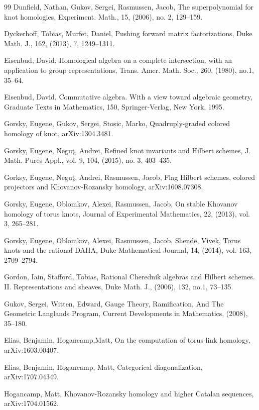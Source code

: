 \documentclass[10pt]{amsart}
\begin{document}
\begin{thebibliography}{99}
Dunfield, Nathan,
Gukov, Sergei,
Rasmussen, Jacob,
The superpolynomial for knot homologies,
Experiment. Math.,
15,
(2006),
no. 2,
129--159.


Dyckerhoff, Tobias, Murfet, Daniel,
Pushing forward matrix factorizations,
Duke Math. J.,
162,
(2013),
7,
1249--1311.


Eisenbud, David,
Homological algebra on a complete intersection, with an application to group representations,
Trans. Amer. Math. Soc.,
260,
(1980),
no.1,
35--64.

Eisenbud, David, Commutative algebra. With a view toward algebraic geometry, Graduate Texts in Mathematics, 150, Springer-Verlag,
New York,
1995.



 Gorsky, Eugene,
Gukov, Sergei,
Stosic, Marko,
Quadruply-graded colored homology of knot, arXiv:1304.3481.

Gorsky, Eugene,
Negu{\c t}, Andrei,
 Refined knot invariants and Hilbert schemes,
J. Math. Pures Appl.,
vol. 9,
104,
(2015),
no. 3,
403--435.

Gorksy, Eugene,
Negu{\c t}, Andrei,
Rasmussen, Jacob,
Flag Hilbert schemes, colored projectors and Khovanov-Rozansky homology,  arXiv:1608.07308.


Gorsky, Eugene, Oblomkov, Alexei,
Rasmussen, Jacob,
On stable Khovanov homology of torus knots, Journal of Experimental Mathematics,
22,
(2013),
vol. 3,
265--281.


 Gorsky, Eugene,
Oblomkov, Alexei,
Rasmussen, Jacob,
Shende, Vivek,
Torus knots and the rational DAHA,
Duke Mathematical Journal,
14,
(2014),
vol. 163,
 2709--2794.


Gordon, Iain,  Stafford, Tobias,
Rational Cherednik algebras and Hilbert schemes. II. Representations and sheaves,
Duke Math. J.,
(2006),
132,
 no.1,
 73--135.


Gukov, Sergei,
Witten, Edward,
Gauge Theory, Ramification, And The Geometric Langlands Program,
Current Developments in Mathematics,
(2008), 35--180.


Elias, Benjamin, Hogancamp,Matt,
On the computation of torus link homology,
 arXiv:1603.00407.


  Elias, Benjamin,
  Hogancamp, Matt,
Categorical diagonalization,  arXiv:1707.04349.


 Hogancamp, Matt, Khovanov-Rozansky homology and higher Catalan sequences,  arXiv:1704.01562.


\end{thebibliography}
\end{document}

